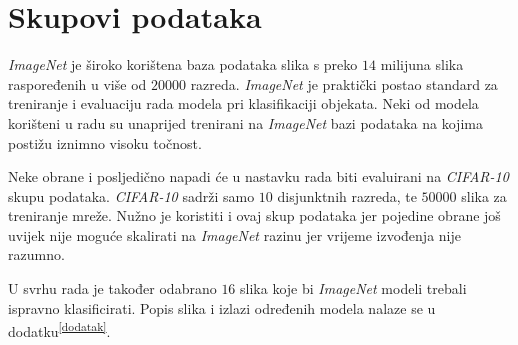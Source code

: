 \documentclass[utf8, diplomski]{fer}
\begin{document}
\section{Skupovi podataka}
\textit{ImageNet}\citep{?} je široko korištena baza podataka slika s preko $14$ milijuna slika raspoređenih u više od $20000$ razreda. \textit{ImageNet} je praktički postao standard za treniranje i evaluaciju rada modela pri klasifikaciji objekata. Neki od modela korišteni u radu su unaprijed trenirani na \textit{ImageNet} bazi podataka na kojima postižu iznimno visoku točnost.
\par
Neke obrane i posljedično napadi će u nastavku rada biti evaluirani na \textit{CIFAR-10}\citep{?} skupu podataka. \textit{CIFAR-10} sadrži samo $10$ disjunktnih razreda, te $50000$ slika za treniranje mreže. Nužno je koristiti i ovaj skup podataka jer pojedine obrane još uvijek nije moguće skalirati na \textit{ImageNet} razinu jer vrijeme izvođenja nije razumno.
\par
U svrhu rada je također odabrano $16$ slika koje bi \textit{ImageNet} modeli trebali ispravno klasificirati. Popis slika i izlazi određenih modela nalaze se u dodatku\textsuperscript{\ref{dodatak}}.
\end{document}
